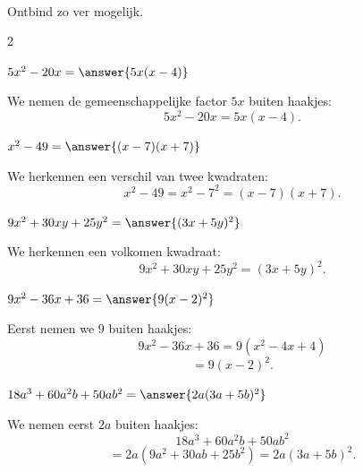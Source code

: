 \documentclass{ximera}
\begin{document}
    
    
    \begin{oefening}[Ontbinden]{\oefB\ESS}
    \\
    
    Ontbind zo ver mogelijk.
    
    \begin{multicols}{2}
    
    \begin{question}
    $5x^2-20x=\answer{5x(x-4)}$
    
    \begin{oplossing}
    We nemen de gemeenschappelijke factor $5x$ buiten haakjes:
    \[
    5x^2-20x
    =5x(x-4).
    \]
    \end{oplossing}
    \end{question}
    
    
    \begin{question}
    $x^2-49=\answer{(x-7)(x+7)}$
    
    \begin{oplossing}
    We herkennen een verschil van twee kwadraten:
    \[
    x^2-49
    =x^2-7^2
    =(x-7)(x+7).
    \]
    \end{oplossing}
    \end{question}
    
    
    \begin{question}
    $9x^2+30xy+25y^2=\answer{(3x+5y)^2}$
    
    \begin{oplossing}
    We herkennen een volkomen kwadraat:
    \[
    9x^2+30xy+25y^2
    =(3x+5y)^2.
    \]
    \end{oplossing}
    \end{question}
    
    
    \begin{question}
    $9x^2-36x+36=\answer{9(x-2)^2}$
    
    \begin{oplossing}
    Eerst nemen we $9$ buiten haakjes:
    \[
    9x^2-36x+36
    =9(x^2-4x+4)
    \]
    \[
    =9(x-2)^2.
    \]
    \end{oplossing}
    \end{question}
    
    
    \begin{question}
    $18a^3+60a^2b+50ab^2=\answer{2a(3a+5b)^2}$
    
    \begin{oplossing}
    We nemen eerst $2a$ buiten haakjes:
    \[
    18a^3+60a^2b+50ab^2
    \]
    \[
    =2a(9a^2+30ab+25b^2)
    =2a(3a+5b)^2.
    \]
    \end{oplossing}
    \end{question}
    

\end{multicols}
\end{oefening}
\end{document}
